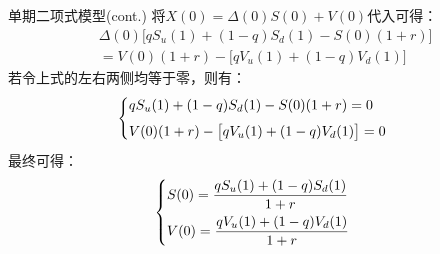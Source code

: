 \documentclass[t]{beamer}
\begin{document}
\begin{frame}{单期二项式模型(cont.)}\small
	将$X(0)=\Delta(0) S(0)+V(0)
	$代入可得：
	\begin{equation*}
		\begin{split}
			&\Delta(0)\Big[ {q{S_u}(1) + (1 - q){S_d}(1) - {S(0)}  (1+r)} \Big] \\
			&= {V(0)}  {(1+r)} - \Big[ {q{V_u}(1) + (1 - q){V_d}(1)} \Big]    
		\end{split}
	\end{equation*}
	若令上式的左右两侧均等于零，则有：
	\begin{equation*}
	\begin{cases}
		\vspace{1ex}		q{S_u}(1) + (1 - q){S_d}(1) - {S(0)}  (1+r)=0\\
	{V(0)}  {(1+r)} - \big[ {q{V_u}(1) + (1 - q){V_d}(1)} \big]=0
	\end{cases}
	\end{equation*}
	最终可得：
	\begin{equation*}
	\begin{cases}
\vspace{1ex}	S(0)=\dfrac{q{S_u}(1) + (1 - q){S_d}(1)}{1+r}\\
	V(0)=\dfrac{q{V_u}(1) + (1 - q){V_d}(1)}{1+r}
	\end{cases}
	\end{equation*}

\end{frame}
\end{document}
